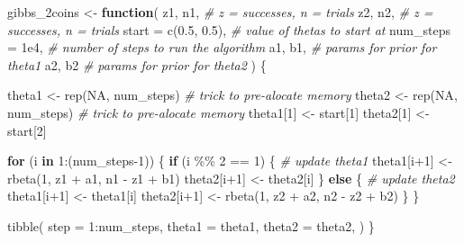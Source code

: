 \documentclass[
  12pt,
]{book}
\newenvironment{Shaded}{\begin{snugshade}}{\end{snugshade}}
\newcommand{\AttributeTok}[1]{\textcolor[rgb]{0.77,0.63,0.00}{#1}}
\newcommand{\CommentTok}[1]{\textcolor[rgb]{0.56,0.35,0.01}{\textit{#1}}}
\newcommand{\ConstantTok}[1]{\textcolor[rgb]{0.00,0.00,0.00}{#1}}
\newcommand{\ControlFlowTok}[1]{\textcolor[rgb]{0.13,0.29,0.53}{\textbf{#1}}}
\newcommand{\DecValTok}[1]{\textcolor[rgb]{0.00,0.00,0.81}{#1}}
\newcommand{\FloatTok}[1]{\textcolor[rgb]{0.00,0.00,0.81}{#1}}
\newcommand{\FunctionTok}[1]{\textcolor[rgb]{0.00,0.00,0.00}{#1}}
\newcommand{\NormalTok}[1]{#1}
\newcommand{\OtherTok}[1]{\textcolor[rgb]{0.56,0.35,0.01}{#1}}
\newcommand{\SpecialCharTok}[1]{\textcolor[rgb]{0.00,0.00,0.00}{#1}}
\theoremstyle{definition}
\theoremstyle{definition}
\theoremstyle{definition}
\theoremstyle{remark}
\begin{document}
\begin{Shaded}
\begin{Highlighting}[]
\NormalTok{gibbs\_2coins }\OtherTok{\textless{}{-}} \ControlFlowTok{function}\NormalTok{(}
\NormalTok{  z1, n1,              }\CommentTok{\# z = successes, n = trials}
\NormalTok{  z2, n2,              }\CommentTok{\# z = successes, n = trials}
  \AttributeTok{start =} \FunctionTok{c}\NormalTok{(}\FloatTok{0.5}\NormalTok{, }\FloatTok{0.5}\NormalTok{), }\CommentTok{\# value of thetas to start at}
  \AttributeTok{num\_steps =} \FloatTok{1e4}\NormalTok{,     }\CommentTok{\# number of steps to run the algorithm}
\NormalTok{  a1, b1,              }\CommentTok{\# params for prior for theta1}
\NormalTok{  a2, b2               }\CommentTok{\# params for prior for theta2}
\NormalTok{  ) \{}
  
\NormalTok{  theta1            }\OtherTok{\textless{}{-}} \FunctionTok{rep}\NormalTok{(}\ConstantTok{NA}\NormalTok{, num\_steps)  }\CommentTok{\# trick to pre{-}alocate memory}
\NormalTok{  theta2            }\OtherTok{\textless{}{-}} \FunctionTok{rep}\NormalTok{(}\ConstantTok{NA}\NormalTok{, num\_steps)  }\CommentTok{\# trick to pre{-}alocate memory}
\NormalTok{  theta1[}\DecValTok{1}\NormalTok{]         }\OtherTok{\textless{}{-}}\NormalTok{ start[}\DecValTok{1}\NormalTok{]}
\NormalTok{  theta2[}\DecValTok{1}\NormalTok{]         }\OtherTok{\textless{}{-}}\NormalTok{ start[}\DecValTok{2}\NormalTok{]}
  
  \ControlFlowTok{for}\NormalTok{ (i }\ControlFlowTok{in} \DecValTok{1}\SpecialCharTok{:}\NormalTok{(num\_steps}\DecValTok{{-}1}\NormalTok{)) \{}
    \ControlFlowTok{if}\NormalTok{ (i }\SpecialCharTok{\%\%} \DecValTok{2} \SpecialCharTok{==} \DecValTok{1}\NormalTok{) \{ }\CommentTok{\# update theta1}
\NormalTok{      theta1[i}\SpecialCharTok{+}\DecValTok{1}\NormalTok{] }\OtherTok{\textless{}{-}} \FunctionTok{rbeta}\NormalTok{(}\DecValTok{1}\NormalTok{, z1 }\SpecialCharTok{+}\NormalTok{ a1, n1 }\SpecialCharTok{{-}}\NormalTok{ z1 }\SpecialCharTok{+}\NormalTok{ b1)}
\NormalTok{      theta2[i}\SpecialCharTok{+}\DecValTok{1}\NormalTok{] }\OtherTok{\textless{}{-}}\NormalTok{ theta2[i]}
\NormalTok{    \} }\ControlFlowTok{else}\NormalTok{ \{           }\CommentTok{\# update theta2}
\NormalTok{      theta1[i}\SpecialCharTok{+}\DecValTok{1}\NormalTok{] }\OtherTok{\textless{}{-}}\NormalTok{ theta1[i]}
\NormalTok{      theta2[i}\SpecialCharTok{+}\DecValTok{1}\NormalTok{] }\OtherTok{\textless{}{-}} \FunctionTok{rbeta}\NormalTok{(}\DecValTok{1}\NormalTok{, z2 }\SpecialCharTok{+}\NormalTok{ a2, n2 }\SpecialCharTok{{-}}\NormalTok{ z2 }\SpecialCharTok{+}\NormalTok{ b2)}
\NormalTok{    \}}
\NormalTok{  \}}
  
  \FunctionTok{tibble}\NormalTok{(}
    \AttributeTok{step =} \DecValTok{1}\SpecialCharTok{:}\NormalTok{num\_steps, }
    \AttributeTok{theta1 =}\NormalTok{ theta1,}
    \AttributeTok{theta2 =}\NormalTok{ theta2,}
\NormalTok{  )}
\NormalTok{\}}
\end{Highlighting}
\end{Shaded}
\end{document}
